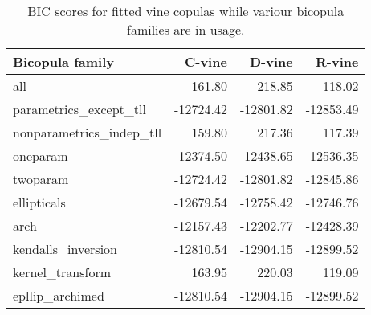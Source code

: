 \begin{table}[H]

\caption{BIC scores for fitted vine copulas while variour bicopula families are in usage.}
\centering
\fontsize{11}{13}\selectfont
\begin{tabular}[t]{lrrr}
\toprule
Bicopula family & C-vine & D-vine & R-vine\\
\midrule
all & 161.80 & 218.85 & 118.02\\
parametrics\_except\_tll & -12724.42 & -12801.82 & -12853.49\\
nonparametrics\_indep\_tll & 159.80 & 217.36 & 117.39\\
oneparam & -12374.50 & -12438.65 & -12536.35\\
twoparam & -12724.42 & -12801.82 & -12845.86\\
ellipticals & -12679.54 & -12758.42 & -12746.76\\
arch & -12157.43 & -12202.77 & -12428.39\\
kendalls\_inversion & -12810.54 & -12904.15 & -12899.52\\
kernel\_transform & 163.95 & 220.03 & 119.09\\
epllip\_archimed & -12810.54 & -12904.15 & -12899.52\\
\bottomrule
\end{tabular}
\end{table}
